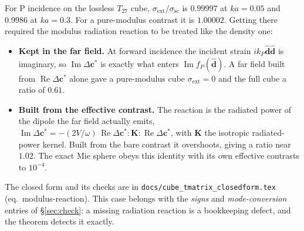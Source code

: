 \documentclass[11pt,a4paper]{article}
\newcommand{\bd}{\hat{\mathbf{d}}}
\newcommand{\sext}{\sigma_{\mathrm{ext}}}
\newcommand{\ssc}{\sigma_{\mathrm{sc}}}
\newcommand{\kp}{k_{P}}
\DeclareMathOperator{\Imag}{Im}
\DeclareMathOperator{\Real}{Re}
\begin{document}
For P incidence on the lossless $T_{27}$ cube, $\sext/\ssc$ is
$0.99997$ at $ka = 0.05$ and $0.9986$ at $ka = 0.3$. For a pure-modulus
contrast it is $1.00002$. Getting there required the modulus radiation
reaction to be treated like the density one:
\begin{itemize}
\item \textbf{Kept in the far field.} At forward incidence the incident
  strain $i\kp\bd\bd$ is imaginary, so $\Imag\Delta\mathbf{c}^*$ is
  exactly what enters $\Imag f_P(\bd)$. A far field built from
  $\Real\Delta\mathbf{c}^*$ alone gave a pure-modulus cube $\sext = 0$
  and the full cube a ratio of $0.61$.
\item \textbf{Built from the effective contrast.} The reaction is the
  radiated power of the dipole the far field actually emits,
  $\Imag\Delta\mathbf{c}^* = -(2V/\omega)\,
  \Real\Delta\mathbf{c}^*:\mathbf{K}:\Real\Delta\mathbf{c}^*$, with
  $\mathbf{K}$ the isotropic radiated-power kernel. Built from the bare
  contrast it overshoots, giving a ratio near $1.02$. The exact Mie
  sphere obeys this identity with its own effective contrasts to
  $10^{-4}$.
\end{itemize}
The closed form and its checks are in
\texttt{docs/cube\_tmatrix\_closedform.tex} (eq.~modulus-reaction).
This case belongs with the \emph{signs} and \emph{mode-conversion}
entries of \S\ref{sec:check}: a missing radiation reaction is a
bookkeeping defect, and the theorem detects it exactly.


\end{document}
